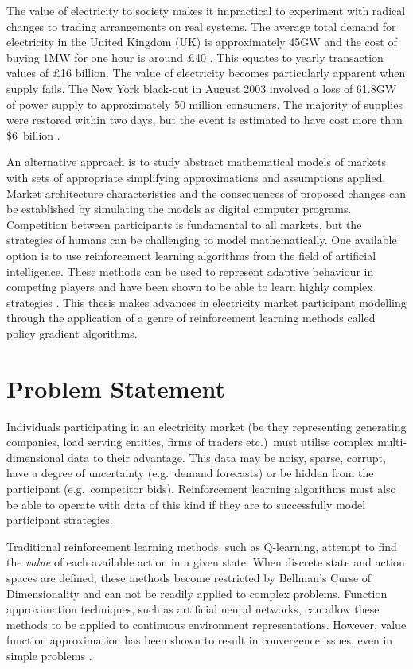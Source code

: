 The value of electricity to society makes it impractical to
experiment with radical changes to trading arrangements on real systems.
The average total demand for electricity in the United Kingdom (UK) is
approximately 45GW and the cost of buying 1MW for one hour is around
\pounds40 \cite{decc:dukes09}. This equates to yearly transaction values of
\pounds16 billion.  The value of electricity becomes particularly
apparent when supply fails. The New York black-out in August 2003 involved
a loss of 61.8GW of power supply to approximately 50 million consumers.
The majority of supplies were restored within two days, but the event is
estimated to have cost more than \$6~billion \cite{minkel:2008,icf:2003}.

An alternative approach is to study abstract mathematical models of markets with
sets of appropriate simplifying approximations and assumptions applied. Market
architecture characteristics and the consequences of proposed changes can be
established by simulating the models as digital computer programs. Competition
between participants is fundamental to all markets, but the strategies of humans
can be challenging to model mathematically. One available option is to use
reinforcement learning algorithms from the field of artificial intelligence.
These methods can be used to represent adaptive behaviour in competing players
and have been shown to be able to learn highly complex strategies
\cite{tesauro:gammon}.  This thesis makes advances in electricity market
participant modelling through the application of a genre of reinforcement
learning methods called policy gradient algorithms.

\section{Problem Statement}%
Individuals participating in an electricity market (be they representing
generating companies, load serving entities, firms of traders etc.)~must utilise
complex multi-dimensional data to their advantage. This data may be noisy,
sparse, corrupt, have a degree of uncertainty (e.g.~demand forecasts) or be
hidden from the participant (e.g.~competitor bids).  Reinforcement learning
algorithms must also be able to operate with data of this kind if they are
to successfully model participant strategies.

Traditional reinforcement learning methods, such as Q-learning, attempt to find
the \textit{value} of each available action in a given state.  When discrete
state and action spaces are defined, these methods become restricted by
Bellman's Curse of Dimensionality \cite{bellman:1961} and can not be readily
applied to complex problems.  Function approximation techniques, such as
artificial neural networks, can allow these methods to be applied to continuous
environment representations. However, value function approximation has been
shown to result in convergence issues, even in simple problems
\cite{tsitsiklis:94,peters:enac,gordon:95,baird:95}.

